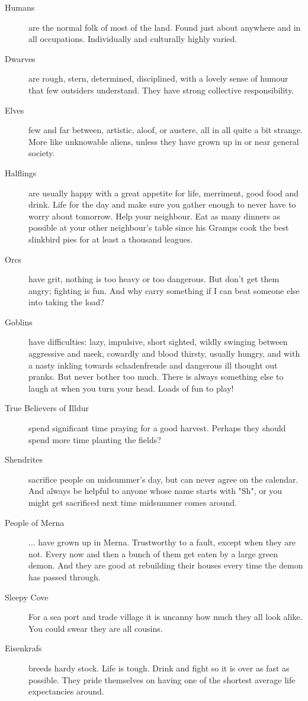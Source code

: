\begin{description}

\item[Humans] are the normal folk of most of the land. Found just about anywhere and in all occupations. Individually and culturally highly varied.

\item[Dwarves] are rough, stern, determined, disciplined, with a lovely sense of humour that few outsiders understand. They have strong collective responsibility.

\item[Elves] few and far between, artistic, aloof, or austere, all in all quite a bit strange. More like unknowable aliens, unless they have grown up in or near general society.

\item[Halflings] are usually happy with a great appetite for life, merriment, good food and drink. Life for the day and make sure you gather enough to never have to worry about tomorrow. Help your neighbour. Eat as many dinners as possible at your other neighbour's table since his Gramps cook the best slinkbird pies for at least a thousand leagues.

\item[Orcs] have grit, nothing is too heavy or too dangerous. But don't get them angry; fighting is fun. And why carry something if I can beat someone else into taking the load?

\item[Goblins] have difficulties: lazy, impulsive, short sighted, wildly swinging between aggressive and meek, cowardly and blood thirsty, usually hungry, and with a nasty inkling towards schadenfreude and dangerous ill thought out pranks. But never bother too much. There is always something else to laugh at when you turn your head. Loads of fun to play!

\item[True Believers of Illdur] spend significant time praying for a good harvest. Perhaps they should spend more time planting the fields?

\item[Shendrites] sacrifice people on midsummer's day, but can never agree on the calendar. And always be helpful to anyone whose name starts with "Sh", or you might get sacrificed next time midsummer comes around.

\item[People of Merna] ... have grown up in Merna. Trustworthy to a fault, except when they are not. Every now and then a bunch of them get eaten by a large green demon. And they are good at rebuilding their houses every time the demon has passed through.

\item[Sleepy Cove] For a sea port and trade village it is uncanny how much they all look alike. You could swear they are all cousins.

\item[Eisenkrafs] breeds hardy stock. Life is tough. Drink and fight so it is over as fast as possible. They pride themselves on having one of the shortest average life expectancies around.

\end{description}
